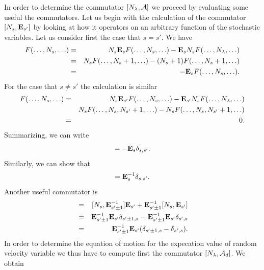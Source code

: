 In order to determine the commutator $[N_{\lambda}, {\cal{A}}]$ we
proceed by evaluating some useful the commutators.
Let us begin with the calculation of the commutator $[N_s, {\bf E}_{s'}]$ by
looking at how it operators on an arbitrary function of the stochastic
variables. Let us consider first the case that $s=s'$. We have
\begin{eqnarray*}
  [N_s,{\bf E}_s] F(\ldots, N_{s}, \ldots) & = & 
         N_s {\bf E}_s F(\ldots, N_{s}, \ldots) -
    {\bf E}_s  N_s F(\ldots, N_{\lambda}, \ldots) \\
                    & = & N_s  F(\ldots, N_{s} +1 , \ldots)
                         - (N_s +1) F(\ldots, N_{s} +1 , \ldots) \\
                    & = & - {\bf E}_s  F(\ldots, N_{s}, \ldots).
\end{eqnarray*}
For the case that $s \ne s'$ the calculation is similar
\begin{eqnarray*}
   [N_s,{\bf E}_{s'}] F(\ldots, N_{s}, \ldots) & = & 
      N_s {\bf E}_{s'} F(\ldots, N_{s}, \ldots)
             -
    {\bf E}_{s'}  N_s F(\ldots, N_{\lambda}, \ldots) \\
   &&    N_s F(\ldots, N_{s}, N_{s'}+1, \ldots) - 
            N_s F(\ldots, N_{s}, N_{s'}+1, \ldots) \\
      & = & 0.    
\end{eqnarray*}
Summarizing, we can write
\begin{displaymath}
  [N_s,{\bf E}_{s'}] = - {\bf E}_s \delta_{s,s'}.  
\end{displaymath}
Similarly, we can show that
\begin{displaymath}
   [N_s,{\bf E}_{s'}^{-1}] = {\bf E}_s^{-1} \delta_{s,s'}. 
\end{displaymath}
Another useful commutator is
\begin{eqnarray*}
  [N_s, {\bf E}^{-1}_{s' \pm 1} {\bf E}_{s'}] & = &
        [N_s, {\bf E}^{-1}_{s' \pm 1}] {\bf E}_{s'}
         +{\bf E}^{-1}_{s' \pm 1} [N_s, {\bf E}_{s'}] \\
     & = & {\bf E}^{-1}_{s' \pm 1} {\bf E}_{s'} \delta_{s' \pm 1,s} 
             - {\bf E}^{-1}_{s' \pm 1} {\bf E}_{s'}  \delta_{s',s} \\
     & = & {\bf E}^{-1}_{s' \pm 1} {\bf E}_{s'} 
                      (\delta_{s' \pm 1,s} -\delta_{s',s} ). 
\end{eqnarray*}
In order to determine the equation of motion for the expecation value of 
random velocity variable we thus have to compute first the commutator
$[N_{\lambda},{\cal{A}}_d]$. We obtain 
